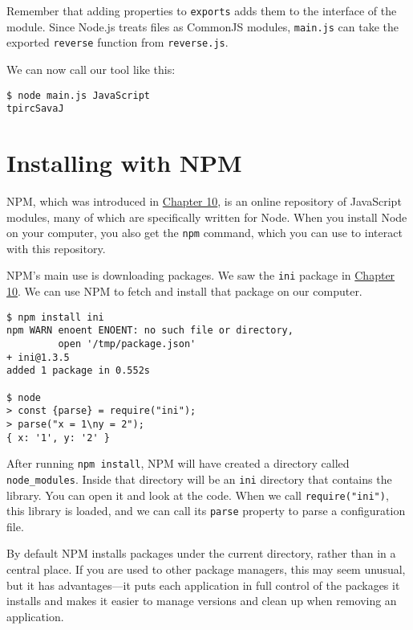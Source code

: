 Remember that adding properties to \lstinline`exports` adds them to the interface of the module. Since Node.js treats files as CommonJS modules, \lstinline`main.js` can take the exported \lstinline`reverse` function from \lstinline`reverse.js`.

We can now call our tool like this:

\begin{lstlisting}
$ node main.js JavaScript
tpircSavaJ
\end{lstlisting}
\noindent

\section{Installing with NPM}

NPM, which was introduced in \hyperref[modules.modules_npm]{Chapter 10}, is an online repository of JavaScript modules, many of which are specifically written for Node. When you install Node on your computer, you also get the \lstinline`npm` command, which you can use to interact with this repository.

NPM's main use is downloading packages. We saw the \lstinline`ini` package in \hyperref[modules.modules_ini]{Chapter 10}. We can use NPM to fetch and install that package on our computer.

\begin{lstlisting}
$ npm install ini
npm WARN enoent ENOENT: no such file or directory,
         open '/tmp/package.json'
+ ini@1.3.5
added 1 package in 0.552s

$ node
> const {parse} = require("ini");
> parse("x = 1\ny = 2");
{ x: '1', y: '2' }
\end{lstlisting}
\noindent{}

After running \lstinline`npm install`, NPM will have created a directory called \lstinline`node_modules`. Inside that directory will be an \lstinline`ini` directory that contains the library. You can open it and look at the code. When we call \lstinline`require("ini")`, this library is loaded, and we can call its \lstinline`parse` property to parse a configuration file.

By default NPM installs packages under the current directory, rather than in a central place. If you are used to other package managers, this may seem unusual, but it has advantages—it puts each application in full control of the packages it installs and makes it easier to manage versions and clean up when removing an application.

